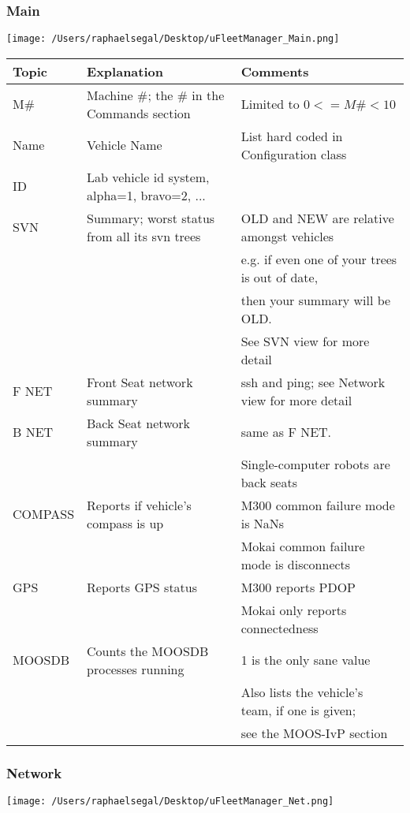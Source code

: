 \documentclass[11pt]{article}
\begin{document}
\subsubsection{Main}
\texttt{[image: /Users/raphaelsegal/Desktop/uFleetManager\_Main.png]}

\begin{tabular}{l|ll}
Topic & Explanation & Comments\\
\hline
M\# & Machine \#; the \# in the Commands section & Limited to $0<=M\#<10$\\
Name & Vehicle Name & List hard coded in Configuration class\\
ID & Lab vehicle id system, alpha=1, bravo=2, ... & \\
SVN & Summary; worst status from all its svn trees & OLD and NEW are relative amongst vehicles\\
&& e.g. if even one of your trees is out of date,\\
&& then your summary will be OLD. \\ && See SVN view for more detail\\
F NET & Front Seat network summary & ssh and ping; see Network view for more detail\\
B NET & Back Seat network summary & same as F NET.\\
&& Single-computer robots are back seats\\
COMPASS & Reports if vehicle's compass is up & M300 common failure mode is NaNs\\&&Mokai common failure mode is disconnects\\
GPS & Reports GPS status & M300 reports PDOP\\&& Mokai only reports connectedness\\
MOOSDB &Counts the MOOSDB processes running & 1 is the only sane value\\&&Also lists the vehicle's team, if one is given; \\&& see the MOOS-IvP section\\
\end{tabular}
\subsubsection{Network}
\texttt{[image: /Users/raphaelsegal/Desktop/uFleetManager\_Net.png]}
\end{document}
